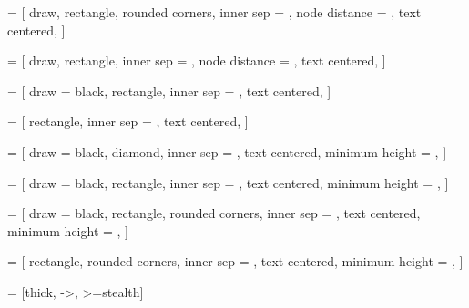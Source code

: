 \makeatletter
\let\mcnewpage=\newpage
\newcommand{\TrickSupertabularIntoMulticols}{%
  \renewcommand\newpage{%
    \if@firstcolumn
      \hrule width\linewidth height0pt
      \columnbreak
    \else
      \mcnewpage
    \fi
  }%
}
\makeatother



\usetikzlibrary{positioning, fit, calc, shapes, arrows}

\newlength{\innersep}
\setlength{\innersep}{2ex}

\newlength{\nodesep}
\setlength{\nodesep}{0.625cm}

\newlength{\lengthSolution}
\settowidth{\lengthSolution}{Solution}

\newlength{\lengthAdjoint}
\settowidth{\lengthAdjoint}{Adjoint}

\newlength{\lengthForward}
\settowidth{\lengthForward}{Forward}

\newlength{\lengthDenovo}
\settowidth{\lengthDenovo}{Denovo}

\newlength{\lengthww}
\settowidth{\lengthww}{$ww$}


 = [
    draw,
    rectangle,
    rounded corners,
    inner sep = \innersep,
    node distance = \nodesep,
    text centered,
]

 = [
    draw,
    rectangle,
    inner sep = \innersep,
    node distance = \nodesep,
    text centered,
]

 = [
    draw = black,
    rectangle,
    inner sep = \innersep,
    text centered,
]

 = [
    rectangle,
    inner sep = \innersep,
    text centered,
]


 = [
    draw = black,
    diamond,
    inner sep = \innersep,
    text centered,
    minimum height = \nodesep,
]

 = [
    draw = black,
    rectangle,
    inner sep = \innersep,
    text centered,
    minimum height = \nodesep,
]

 = [
    draw = black,
    rectangle, rounded corners,
    inner sep = \innersep,
    text centered,
    minimum height = \nodesep,
]

 = [
    rectangle, rounded corners,
    inner sep = \innersep,
    text centered,
    minimum height = \nodesep,
]

 = [thick, ->, >=stealth]
